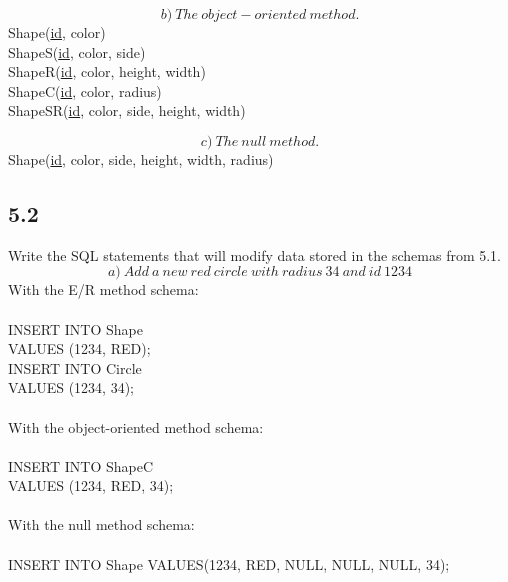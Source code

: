 \documentclass[12pt]{article}
\begin{document}
$$b)\: The\:object-oriented\:method.$$
Shape(\underline{id}, color)\\
ShapeS(\underline{id}, color, side)\\
ShapeR(\underline{id}, color, height, width)\\
ShapeC(\underline{id}, color, radius)\\
ShapeSR(\underline{id}, color, side, height, width)

$$c)\: The\:null\:method.$$
Shape(\underline{id}, color, side, height, width, radius)

\subsection*{5.2}
Write the SQL statements that will modify data stored in the schemas from 5.1.
$$a)\: Add\:a\:new\:red\:circle\:with\:radius\:34\:and\:id\:1234$$
With the E/R method schema:\\
\\
INSERT INTO 	Shape\\
VALUES (1234, RED);\\
INSERT INTO Circle\\
VALUES (1234, 34);\\
\\
With the object-oriented method schema:\\
\\
INSERT INTO ShapeC\\
VALUES (1234, RED, 34);\\
\\
With the null method schema:\\
\\
INSERT INTO Shape
VALUES(1234, RED, NULL, NULL, NULL, 34);\\
\end{document}
